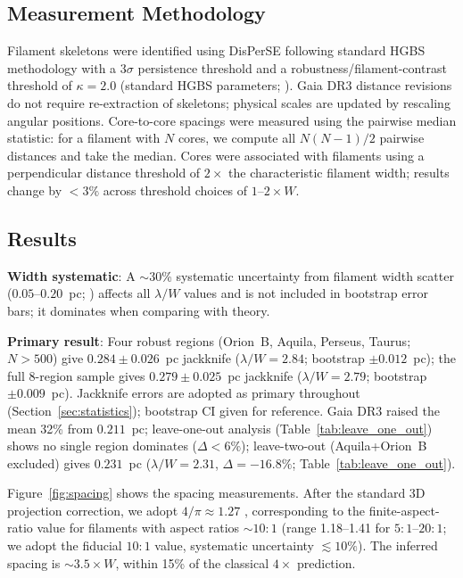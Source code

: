\documentclass[twoside,twocolumn]{mnras}
\begin{document}
\subsection{Measurement Methodology}

Filament skeletons were identified using DisPerSE \citep{Sousbie2011} following standard
HGBS methodology with a $3\sigma$ persistence threshold and a robustness/filament-contrast
threshold of $\kappa = 2.0$ (standard HGBS parameters; \citealt{Arzoumanian2011}). Gaia DR3 distance revisions
do not require re-extraction of skeletons; physical scales are updated by rescaling
angular positions. Core-to-core spacings were measured using the pairwise median
statistic: for a filament with $N$ cores, we compute all $N(N-1)/2$ pairwise distances
and take the median. Cores were associated with filaments using a perpendicular
distance threshold of $2\times$ the characteristic filament width; results change
by $<3\%$ across threshold choices of $1$--$2\times W$.

\subsection{Results}
\label{sec:results}

\textbf{Width systematic}: A $\sim$30\% systematic uncertainty from filament width
scatter ($0.05$--$0.20$~pc; \citealt{Panopoulou2022}) affects all $\lambda/W$ values
and is not included in bootstrap error bars; it dominates when comparing with theory.

\textbf{Primary result}: Four robust regions (Orion~B, Aquila, Perseus, Taurus;
$N > 500$) give $0.284 \pm 0.026$~pc jackknife ($\lambda/W = 2.84$; bootstrap
$\pm 0.012$~pc); the full 8-region sample gives $0.279 \pm 0.025$~pc jackknife
($\lambda/W = 2.79$; bootstrap $\pm 0.009$~pc). Jackknife errors are adopted as
primary throughout (Section~\ref{sec:statistics}); bootstrap CI given for reference.
Gaia DR3 raised the mean 32\% from $0.211$~pc; leave-one-out analysis
(Table~\ref{tab:leave_one_out}) shows no single region dominates ($\Delta < 6\%$);
leave-two-out (Aquila+Orion~B excluded) gives $0.231$~pc ($\lambda/W = 2.31$,
$\Delta = -16.8\%$; Table~\ref{tab:leave_one_out}).

Figure~\ref{fig:spacing} shows the spacing measurements. After the standard 3D projection
correction, we adopt $4/\pi \approx 1.27$ \citep{Andre2010}, corresponding to the
\citet{Hacar2013} finite-aspect-ratio value for filaments with aspect ratios ${\sim}10{:}1$
(range 1.18--1.41 for $5{:}1$--$20{:}1$; we adopt the fiducial $10{:}1$ value, systematic
uncertainty $\lesssim 10\%$). The inferred spacing is ${\sim}3.5\times W$, within 15\%
of the classical $4\times$ prediction.
\end{document}
